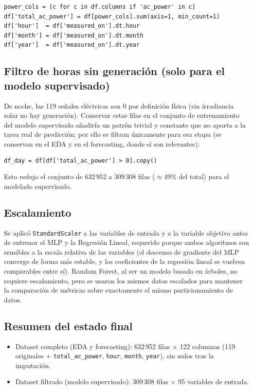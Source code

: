 \begin{verbatim}
power_cols = [c for c in df.columns if 'ac_power' in c]
df['total_ac_power'] = df[power_cols].sum(axis=1, min_count=1)
df['hour']  = df['measured_on'].dt.hour
df['month'] = df['measured_on'].dt.month
df['year']  = df['measured_on'].dt.year
\end{verbatim}

\subsection*{Filtro de horas sin generación (solo para el modelo supervisado)}

De noche, las 119 señales eléctricas son 0 por definición física (sin irradiancia solar no hay generación). Conservar estas filas en el conjunto de entrenamiento del modelo supervisado añadiría un patrón trivial y constante que no aporta a la tarea real de predicción; por ello se filtran únicamente para esa etapa (se conservan en el EDA y en el forecasting, donde sí son relevantes):

\begin{verbatim}
df_day = df[df['total_ac_power'] > 0].copy()
\end{verbatim}

Esto redujo el conjunto de 632\,952 a 309\,308 filas ($\approx$49\% del total) para el modelado supervisado.

\subsection*{Escalamiento}

Se aplicó \texttt{StandardScaler} a las variables de entrada y a la variable objetivo antes de entrenar el MLP y la Regresión Lineal, requerido porque ambos algoritmos son sensibles a la escala relativa de las variables (el descenso de gradiente del MLP converge de forma más estable, y los coeficientes de la regresión lineal se vuelven comparables entre sí). Random Forest, al ser un modelo basado en árboles, no requiere escalamiento, pero se usaron los mismos datos escalados para mantener la comparación de métricas sobre exactamente el mismo particionamiento de datos.

\subsection*{Resumen del estado final}

\begin{itemize}
    \item Dataset completo (EDA y forecasting): 632\,952 filas $\times$ 122 columnas (119 originales + \texttt{total\_ac\_power}, \texttt{hour}, \texttt{month}, \texttt{year}), sin nulos tras la imputación.
    \item Dataset filtrado (modelo supervisado): 309\,308 filas $\times$ 95 variables de entrada.
\end{itemize}
